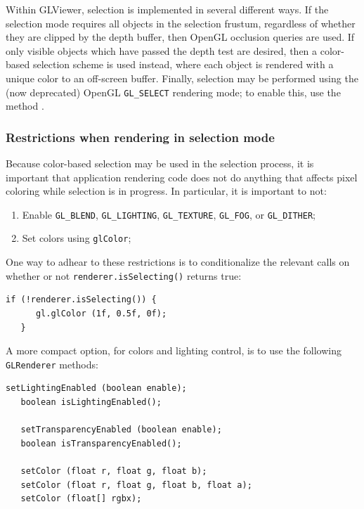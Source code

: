 \documentclass{article}
\begin{document}

Within GLViewer, selection is implemented in several different ways.
If the selection mode requires all objects in the selection frustum,
regardless of whether they are clipped by the depth buffer, then
OpenGL occlusion queries are used. If only visible objects which have
passed the depth test are desired, then a color-based selection scheme
is used instead, where each object is rendered with a unique color to
an off-screen buffer. Finally, selection may be performed using the
(now deprecated) OpenGL {\tt GL\_SELECT} rendering mode; to enable
this, use the method .

\subsubsection{Restrictions when rendering in selection mode}

Because color-based selection may be used in the selection process, it
is important that application rendering code does not do anything that
affects pixel coloring while selection is in progress. In particular,
it is important to not:

\begin{enumerate}

\item Enable {\tt GL\_BLEND}, {\tt GL\_LIGHTING}, {\tt GL\_TEXTURE}, {\tt GL\_FOG},
or {\tt GL\_DITHER};

\item Set colors using {\tt glColor};

\end{enumerate}


One way to adhear to these restrictions is to conditionalize the
relevant calls on whether or not {\tt renderer.isSelecting()} returns
true:
\begin{lstlisting}[]
   if (!renderer.isSelecting()) {
      gl.glColor (1f, 0.5f, 0f);
   }
\end{lstlisting}

A more compact option, for colors and lighting control, is to use the
following {\tt GLRenderer} methods:

\begin{lstlisting}[]
   setLightingEnabled (boolean enable);
   boolean isLightingEnabled();
   
   setTransparencyEnabled (boolean enable);
   boolean isTransparencyEnabled();

   setColor (float r, float g, float b);
   setColor (float r, float g, float b, float a);
   setColor (float[] rgbx);
\end{lstlisting}
\end{document}

